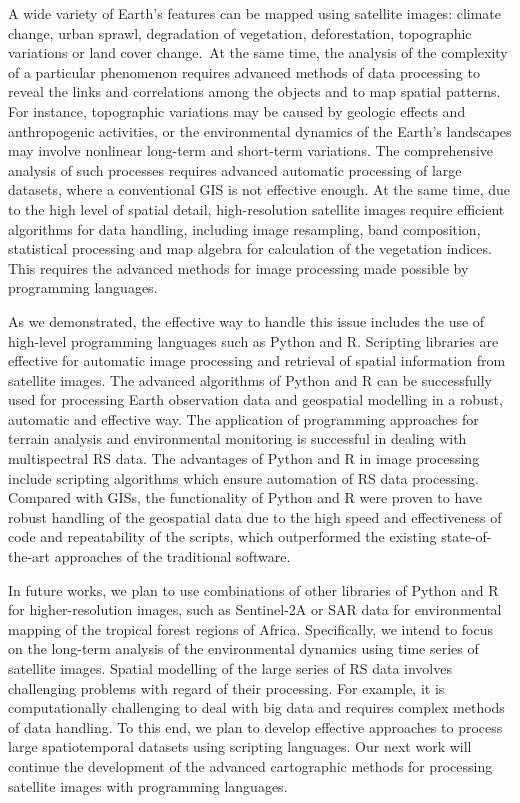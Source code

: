 \documentclass[jimaging,article,accept,pdftex,moreauthors]{Definitions/mdpi}
\begin{document}
A wide variety of Earth's features can be {mapped using} satellite images{: }climate change, urban sprawl, degradation {of vegetation}, deforestation, topographic variations{ }or land cover change.~At the same time, the analysis of the complexity of {a} particular{ }phenomenon requires advanced methods of data processing to reveal the links and correlations among the objects and to map spatial patterns. For instance, topographic variations{ }may be caused by geologic effects and anthropogenic activities, or the environmental dynamics of the Earth's landscapes may involve nonlinear long-term and short-term variations. The comprehensive analysis of such processes requires {advanced automatic} processing of large datasets, where a conventional GIS is not effective enough. {At the same time, due} to the high level of spatial detail, high-resolution satellite images require efficient algorithms for data handling, including image resampling, band composition, statistical processing and map algebra for calculation of the vegetation indices. This requires the advanced {methods for} image processing {made possible by programming languages}.

As we demonstrated{, }the effective way to handle this issue includes the {use} of high-level programming languages such as Python and R{. Scripting libraries are effective }for automatic image processing and retrieval of spatial information from {satellite} images. {The advanced }algorithms of {Python and R} can be successfully used for processing Earth observation data and geospatial modelling in a robust, automatic and effective way. {The application of }programming {approaches} for terrain analysis and environmental monitoring {is} successful in dealing with{ }multispectral {RS} data. The advantages of Python and R in image processing include{ }scripting algorithms which ensure automation of {RS} data processing.{ }Compared with{ }GISs{,} the functionality of Python and R{ }were proven{ }to have robust handling of the geospatial data{ due to the high }speed and effectiveness of code{ and repeatability of the scripts, which} outperformed{ }the existing{ state-of-the-art }approaches {of the traditional software}. 

In future works, we plan to {use} combinations of other libraries of Python and R for {higher-resolution images, such as} Sentinel-2A {or} SAR data for{ }environmental {mapping of} the tropical forest {regions} of Africa. Specifically, we intend to focus on the long-term analysis of the environmental dynamics using time series of satellite images. Spatial modelling of {the} large series of {RS data} involves{ }challenging problems with regard of their processing. For example, it is computationally challenging to deal with big data and requires complex methods of {data} handling. To this end, we plan to develop effective approaches to{ process }large spatiotemporal datasets using scripting languages.{ Our next work will continue the development of the advanced cartographic methods for processing satellite images with programming languages}.
\end{document}
